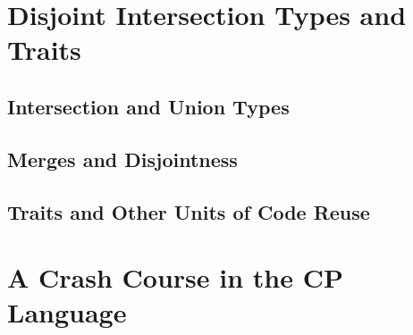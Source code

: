 \chapter{Disjoint Intersection Types and Traits} \label{ch:background}

\section{Intersection and Union Types}

\section{Merges and Disjointness}

\section{Traits and Other Units of Code Reuse}

\chapter{A Crash Course in the CP Language} \label{ch:cp}
